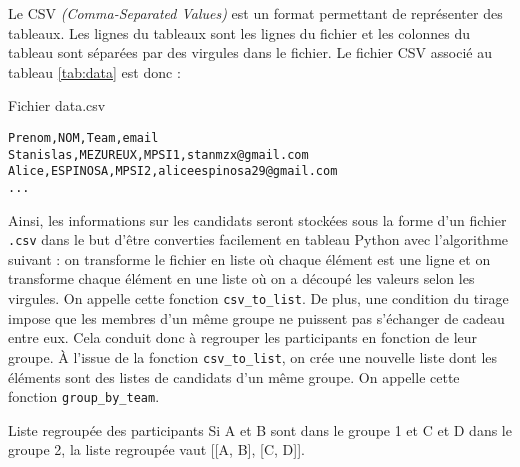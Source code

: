 \documentclass[a4paper, 12pt]{report}
\begin{document}
            Le CSV \textit{(Comma-Separated Values)} est un format permettant de représenter des tableaux. Les lignes du tableaux sont les lignes du fichier et les colonnes du tableau sont séparées par des virgules dans le fichier. 
            Le fichier CSV associé au tableau \ref{tab:data} est donc :
            \begin{longlisting}
                \caption{Fichier data.csv}
                \begin{verbatim}
Prenom,NOM,Team,email
Stanislas,MEZUREUX,MPSI1,stanmzx@gmail.com
Alice,ESPINOSA,MPSI2,aliceespinosa29@gmail.com
...
                \end{verbatim}
            \end{longlisting}
            Ainsi, les informations sur les candidats seront stockées sous la forme d'un fichier \texttt{.csv} dans le but d'être converties facilement en tableau Python avec l'algorithme suivant : on transforme le fichier en liste où chaque élément est une ligne et on transforme chaque élément en une liste où on a \og découpé\fg{} les valeurs selon les virgules. On appelle cette fonction \texttt{csv\_to\_list}.
            \bigbreak
            De plus, une condition du tirage impose que les membres d'un même groupe ne puissent pas s'échanger de cadeau entre eux. Cela conduit donc à regrouper les participants en fonction de leur groupe. À l'issue de la fonction \texttt{csv\_to\_list}, on crée une nouvelle liste dont les éléments sont des listes de candidats d'un même groupe. On appelle cette fonction \texttt{group\_by\_team}.
            \begin{example}{Liste regroupée des participants}{}
                Si A et B sont dans le groupe 1 et C et D dans le groupe 2, la liste regroupée vaut [[A, B], [C, D]].
            \end{example}
\end{document}
